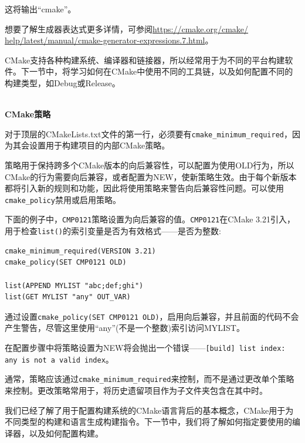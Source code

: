 这将输出“cmake”。

想要了解生成器表达式更多详情，可参阅\url{https://cmake.org/cmake/
help/latest/manual/cmake-generator-expressions.7.html}。

CMake支持各种构建系统、编译器和链接器，所以经常用于为不同的平台构建软件。下一节中，将学习如何在CMake中使用不同的工具链，以及如何配置不同的构建类型，如Debug或Release。

\hspace*{\fill} \\ %
\noindent
\textbf{CMake策略}

对于顶层的CMakeLists.txt文件的第一行，必须要有\texttt{cmake\_minimum\_required}，因为其会设置用于构建项目的内部CMake策略。

策略用于保持跨多个CMake版本的向后兼容性，可以配置为使用OLD行为，所以CMake的行为需要向后兼容，或者配置为NEW，使新策略生效。由于每个新版本都将引入新的规则和功能，因此将使用策略来警告向后兼容性问题。可以使用\texttt{cmake\_policy}禁用或启用策略。

下面的例子中，\texttt{CMP0121}策略设置为向后兼容的值。\texttt{CMP0121}在CMake 3.21引入，用于检查\texttt{list()}的索引变量是否为有效格式——是否为整数:

\begin{lstlisting}[style=styleCMake]
cmake_minimum_required(VERSION 3.21)
cmake_policy(SET CMP0121 OLD)

list(APPEND MYLIST "abc;def;ghi")
list(GET MYLIST "any" OUT_VAR)
\end{lstlisting}

通过设置\texttt{cmake\_policy(SET CMP0121 OLD)}，启用向后兼容，并且前面的代码不会产生警告，尽管这里使用“any”(不是一个整数)索引访问MYLIST。

在配置步骤中将策略设置为NEW将会抛出一个错误——\texttt{[build] list index: any is not a valid index}。

\begin{tcolorbox}[colback=blue!5!white,colframe=blue!75!black,title=除非包含遗留项目，否则避免设置策略]
通常，策略应该通过\texttt{cmake\_minimum\_required}来控制，而不是通过更改单个策略来控制。更改策略常用于，将历史遗留项目作为子文件夹包含在其中时。
\end{tcolorbox}

我们已经了解了用于配置构建系统的CMake语言背后的基本概念，CMake用于为不同类型的构建和语言生成构建指令。下一节中，我们将了解如何指定要使用的编译器，以及如何配置构建。












